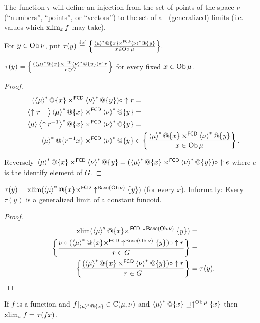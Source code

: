 The function $\tau$ will define an injection from the set of points
of the space $\nu$ (``numbers'', ``points'', or ``vectors'')
to the set of all (generalized) limits (i.e. values which $\operatorname{xlim}_{x}f$
may take).
\begin{defn}
For $y\in\operatorname{Ob}\nu$, put
$\tau(y)\overset{\mathrm{def}}{=}\left\{ \frac{\left\langle \mu\right\rangle ^{\ast}@\{x\}\times^{\mathsf{FCD}}\left\langle \nu\right\rangle ^{\ast}@\{y\}}{x\in\operatorname{Ob}\mu}\right\}$.\end{defn}
\begin{prop}
$\tau(y)=\left\{ \frac{(\left\langle \mu\right\rangle ^{\ast}@\{x\}\times^{\mathsf{FCD}}\left\langle \nu\right\rangle ^{\ast}@\{y\})\circ\uparrow r}{r\in G}\right\}$
for every fixed $x\in\operatorname{Ob}\mu$.\end{prop}
\begin{proof}
~
\begin{align*}
(\left\langle \mu\right\rangle ^{\ast}@\{x\}\times^{\mathsf{FCD}}\left\langle \nu\right\rangle ^{\ast}@\{y\})\circ\uparrow r & =\\
\left\langle \uparrow r^{-1}\right\rangle\left\langle \mu\right\rangle ^{\ast}@\{x\}\times^{\mathsf{FCD}}\left\langle \nu\right\rangle ^{\ast}@\{y\} & =\\
\left\langle \mu\right\rangle\left\langle \uparrow r^{-1}\right\rangle ^{\ast}@\{x\}\times^{\mathsf{FCD}}\left\langle \nu\right\rangle ^{\ast}@\{y\} & =\\
\left\langle \mu\right\rangle ^{\ast}@\{r^{-1}x\}\times^{\mathsf{FCD}}\left\langle \nu\right\rangle ^{\ast}@\{y\} & \in \left\{ \frac{\left\langle \mu\right\rangle ^{\ast}@\{x\}\times^{\mathsf{FCD}}\left\langle \nu\right\rangle ^{\ast}@\{y\}}{x\in\operatorname{Ob}\mu}\right\}.
\end{align*}


Reversely $\left\langle \mu\right\rangle ^{\ast}@\{x\}\times^{\mathsf{FCD}}\left\langle \nu\right\rangle ^{\ast}@\{y\}=(\left\langle \mu\right\rangle ^{\ast}@\{x\}\times^{\mathsf{FCD}}\left\langle \nu\right\rangle ^{\ast}@\{y\})\circ\uparrow e$
where $e$ is the identify element of $G$.\end{proof}
\begin{prop}
$\tau(y)=\operatorname{xlim}(\left\langle \mu\right\rangle ^{\ast}@\{x\}\times^{\mathsf{FCD}}\uparrow^{\operatorname{Base}(\operatorname{Ob}\nu)}\{y\})$
(for every $x$). Informally: Every $\tau(y)$ is a generalized limit
of a constant funcoid.\end{prop}
\begin{proof}
~
\begin{align*}
\operatorname{xlim}(\left\langle \mu\right\rangle ^{\ast}@\{x\}\times^{\mathsf{FCD}}\uparrow^{\operatorname{Base}(\operatorname{Ob}\nu)}\{y\}) & =\\
\left\{ \frac{\nu\circ(\left\langle \mu\right\rangle ^{\ast}@\{x\}\times^{\mathsf{FCD}}\uparrow^{\operatorname{Base}(\operatorname{Ob}\nu)}\{y\})\circ\uparrow r}{r\in G}\right\} & =\\
\left\{ \frac{(\left\langle \mu\right\rangle ^{\ast}@\{x\}\times^{\mathsf{FCD}}\left\langle \nu\right\rangle ^{\ast}@\{y\})\circ\uparrow r}{r\in G}\right\} & =\tau(y).
\end{align*}
\end{proof}
\begin{thm}
If $f$ is a function and $f|_{\left\langle \mu\right\rangle ^{\ast}@\{x\}}\in\mathrm{C}(\mu,\nu)$
and $\left\langle \mu\right\rangle ^{\ast}@\{x\}\sqsupseteq\uparrow^{\operatorname{Ob}\mu}\{x\}$
then $\operatorname{xlim}_{x}f=\tau(fx)$.\end{thm}
